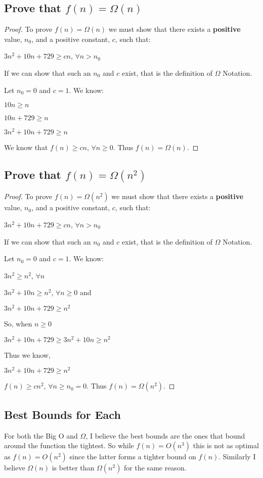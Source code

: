 \documentclass[12pt]{article}
\begin{document}
\subsection{Prove that $f(n) = \Omega(n)$}

\begin{proof}
To prove $f(n) = \Omega(n)$ we must show that there exists a \textbf{positive} value, $n_{0}$, and a positive constant, $c$, such that:
\begin{center}
$ 3n^2 + 10n + 729 \geq cn $,  $\forall n > n_{0}$
\end{center}
If we can show that such an $n_{0}$ and $c$ exist, that is the definition of $\Omega$ Notation.

Let $n_{0} = 0$ and $c = 1$. We know:
\begin{center}
$10n \geq n$

$10n + 729 \geq n$

$3n^2 + 10n + 729 \geq n$

\end{center}
We know that $f(n) \geq cn$, $\forall n \geq 0$. Thus $f(n) = \Omega(n)$.
\end{proof}
\pagebreak
\subsection{Prove that $f(n) = \Omega (n^2)$}

\begin{proof}
To prove $f(n) = \Omega(n^2)$ we must show that there exists a \textbf{positive} value, $n_{0}$, and a positive constant, $c$, such that:
\begin{center}
$ 3n^2 + 10n + 729 \geq cn $,  $\forall n > n_{0}$
\end{center}
If we can show that such an $n_{0}$ and $c$ exist, that is the definition of $\Omega$ Notation.

Let $n_{0} = 0$ and $c = 1$. We know:
\begin{center}
$3n^2 \geq n^2$, $\forall n $

$3n^2 + 10n \geq n^2$, $\forall n \geq 0$ and

$3n^2 + 10n + 729 \geq n^2$

\end{center}
So, when $n \geq 0$
\begin{center}
$3n^2 + 10n + 729 \geq 3n^2 + 10n \geq n^2$
\end{center}
Thus we know,
\begin{center}
$3n^2 + 10n + 729 \geq n^2$
\end{center}
$f(n) \geq cn^2$, $\forall n \geq n_{0} = 0$. Thus $f(n) = \Omega(n^2)$.
\end{proof}
\pagebreak

\subsection{Best Bounds for Each}
For both the Big O and $\Omega$, I believe the best bounds are the ones that bound around the function the tightest. So while $f(n) = O(n^3)$ this is not as optimal as $f(n) = O(n^2)$ since the latter forms a tighter bound on $f(n)$. Similarly I believe $\Omega(n)$ is better than $\Omega(n^2)$ for the same reason.
\end{document}
